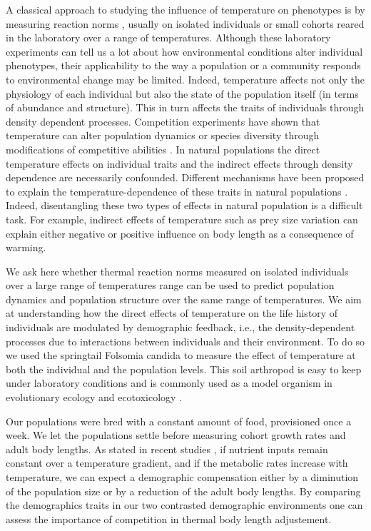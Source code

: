 A classical approach to studying the influence of temperature on phenotypes is
by measuring reaction norms \autocites{woltereck1909a}, usually on isolated
individuals \autocites{driessen2007a,ellers2011b} or small cohorts
\autocites{liefting2009a,karan1998a} reared in the laboratory over a range of
temperatures. Although these laboratory experiments can tell us a lot about how
environmental conditions alter individual phenotypes, their applicability to the
way a population or a community responds to environmental change may be limited.
Indeed, temperature affects not only the physiology of each individual but also
the state of the population itself (in terms of abundance and structure). This
in turn affects the traits of individuals through density dependent processes.
Competition experiments have shown that temperature can alter population
dynamics or species diversity through modifications of competitive abilities
\autocites{park1954a,tilman1981competition}. In natural populations the direct
temperature effects on individual traits and the indirect effects through
density dependence are necessarily confounded. Different mechanisms have been
proposed to explain the temperature-dependence of these traits in natural
populations \autocites{sheridan2011a}.
Indeed, disentangling these two types of effects in natural population is a
difficult task.  For example, indirect effects of temperature such as prey size
variation can explain either negative \autocites{husby2011testing} or positive
\autocites{yom2008recent} influence on body length as a
consequence of warming.

We ask here whether thermal reaction norms measured on isolated individuals over
a large range of temperatures range can be used to predict population dynamics
and population structure over the same range of temperatures. We aim at
understanding how the direct effects of temperature on the life history of
individuals are modulated by demographic feedback, i.e., the density-dependent
processes due to interactions between individuals and their environment. To do
so we used the springtail Folsomia candida to measure the effect of temperature
at both the individual and the population levels. This soil arthropod is easy to
keep under laboratory conditions and is commonly used as a model organism in
evolutionary ecology and ecotoxicology
\autocites{fountain2005a,tully2005a,tully2008a,tully2011a}.

Our populations were bred with a constant amount of food, provisioned once a
week. We let the populations settle before measuring cohort growth rates and
adult body lengths. As stated in recent studies
\autocites{sheridan2011a,reuman2014metabolic}, if nutrient inputs remain
constant over a temperature gradient, and if the metabolic rates increase with
temperature, we can expect a demographic compensation either by a diminution of
the population size or by a reduction of the adult body lengths. By comparing
the demographics traits in our two contrasted demographic environments one can
assess the importance of competition in thermal body length adjustement.

